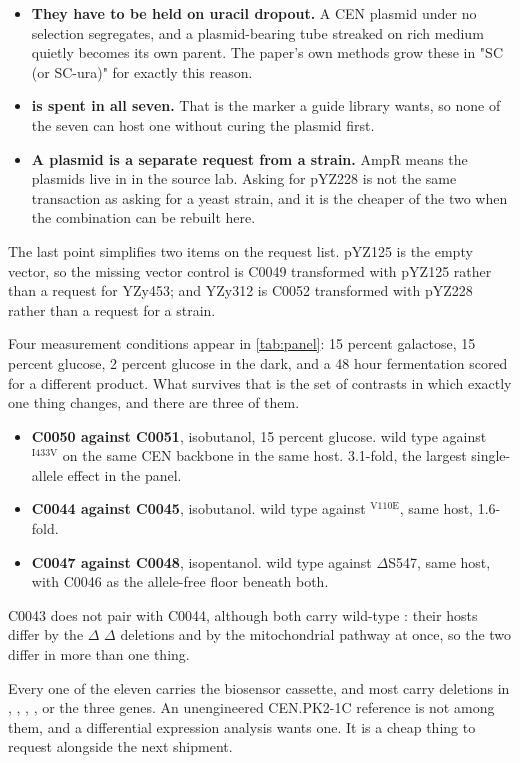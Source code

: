 \begin{itemize}\setlength\itemsep{0.15em}
  \item \textbf{They have to be held on uracil dropout.} A CEN 
    plasmid under no selection segregates, and a plasmid-bearing tube streaked
    on rich medium quietly becomes its own parent. The paper's own methods grow
    these in "SC (or SC-ura)" for exactly this reason.
  \item \textbf{ is spent in all seven.} That is the marker a guide
    library wants, so none of the seven can host one without curing the plasmid
    first.
  \item \textbf{A plasmid is a separate request from a strain.} AmpR means the
    plasmids live in  in the source lab. Asking for pYZ228 is not
    the same transaction as asking for a yeast strain, and it is the cheaper of
    the two when the combination can be rebuilt here.
\end{itemize}

\noindent
The last point simplifies two items on the request list. pYZ125 is the empty
vector, so the missing vector control is C0049 transformed with pYZ125 rather
than a request for YZy453; and YZy312 is C0052 transformed with pYZ228 rather
than a request for a strain.

 Four measurement conditions
appear in \cref{tab:panel}: 15 percent galactose, 15 percent glucose, 2 percent
glucose in the dark, and a 48 hour fermentation scored for a different product.
What survives that is the set of contrasts in which exactly one thing changes,
and there are three of them.

\begin{itemize}\setlength\itemsep{0.15em}
  \item \textbf{C0050 against C0051}, isobutanol, 15 percent glucose.
     wild type against $^{\text{I433V}}$ on the
    same CEN backbone in the same host. 3.1-fold, the largest single-allele
    effect in the panel.
  \item \textbf{C0044 against C0045}, isobutanol.  wild type against
    $^{\text{V110E}}$, same host, 1.6-fold.
  \item \textbf{C0047 against C0048}, isopentanol.  wild type
    against $\Delta$S547, same host, with C0046 as the allele-free
    floor beneath both.
\end{itemize}

\noindent
C0043 does not pair with C0044, although both carry wild-type :
their hosts differ by the $\Delta$ $\Delta$ deletions and
by the mitochondrial pathway at once, so the two differ in more than one thing.

 Every one of the eleven carries the
biosensor cassette, and most carry deletions in , ,
, ,  or the three  genes. An
unengineered CEN.PK2-1C reference is not among them, and a differential
expression analysis wants one. It is a cheap thing to request alongside the
next shipment.
